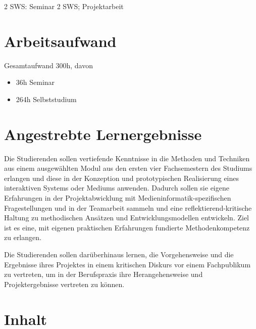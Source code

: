 2 SWS: Seminar 2 SWS; Projektarbeit

\hypertarget{arbeitsaufwandpathlabelmi-2017modulbeschreibungen-bachelorba_entwicklungsprojekt}{%
\section*{Arbeitsaufwand\label{/mi-2017/modulbeschreibungen-bachelor/BA_Entwicklungsprojekt}}\label{arbeitsaufwandpathlabelmi-2017modulbeschreibungen-bachelorba_entwicklungsprojekt}}

Gesamtaufwand 300h, davon

\begin{itemize}
\tightlist
\item
  36h Seminar
\item
  264h Selbststudium
\end{itemize}

\hypertarget{angestrebte-lernergebnissepathlabelmi-2017modulbeschreibungen-bachelorba_entwicklungsprojekt}{%
\section*{Angestrebte
Lernergebnisse\label{/mi-2017/modulbeschreibungen-bachelor/BA_Entwicklungsprojekt}}\label{angestrebte-lernergebnissepathlabelmi-2017modulbeschreibungen-bachelorba_entwicklungsprojekt}}

Die Studierenden sollen vertiefende Kenntnisse in die Methoden und
Techniken aus einem ausgewählten Modul aus den ersten vier Fachsemestern
des Studiums erlangen und diese in der Konzeption und prototypischen
Realisierung eines interaktiven Systems oder Mediums anwenden. Dadurch
sollen sie eigene Erfahrungen in der Projektabwicklung mit
Medieninformatik-spezifischen Fragestellungen und in der Teamarbeit
sammeln und eine reflektierend-kritische Haltung zu methodischen
Ansätzen und Entwicklungsmodellen entwickeln. Ziel ist es eine, mit
eigenen praktischen Erfahrungen fundierte Methodenkompetenz zu erlangen.

Die Studierenden sollen darüberhinaus lernen, die Vorgehensweise und die
Ergebnisse ihres Projektes in einem kritischen Diskurs vor einem
Fachpublikum zu vertreten, um in der Berufspraxis ihre Herangehensweise
und Projektergebnisse vertreten zu können.

\hypertarget{inhaltpathlabelmi-2017modulbeschreibungen-bachelorba_entwicklungsprojekt}{%
\section*{Inhalt\label{/mi-2017/modulbeschreibungen-bachelor/BA_Entwicklungsprojekt}}\label{inhaltpathlabelmi-2017modulbeschreibungen-bachelorba_entwicklungsprojekt}}

